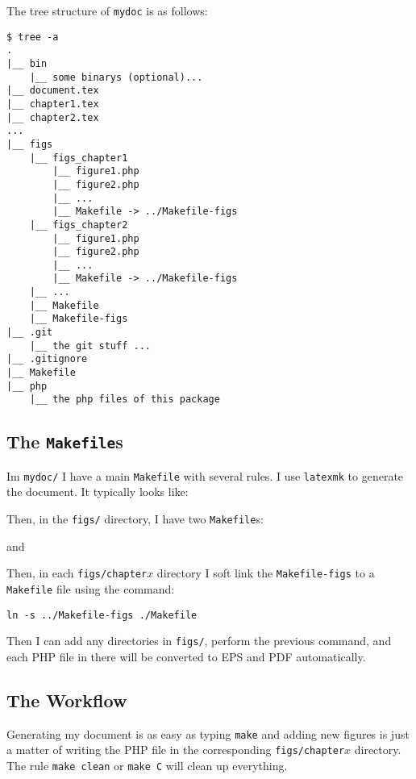 \documentclass[a4paper]{scrartcl}
\begin{document}
The tree structure of \texttt{mydoc} is as follows:
\begin{lstlisting}
$ tree -a
.
|__ bin
    |__ some binarys (optional)...
|__ document.tex
|__ chapter1.tex
|__ chapter2.tex
...
|__ figs
    |__ figs_chapter1
        |__ figure1.php
        |__ figure2.php
        |__ ...
        |__ Makefile -> ../Makefile-figs
    |__ figs_chapter2
        |__ figure1.php
        |__ figure2.php
        |__ ...
        |__ Makefile -> ../Makefile-figs
    |__ ...
    |__ Makefile
    |__ Makefile-figs
|__ .git
    |__ the git stuff ...
|__ .gitignore
|__ Makefile
|__ php
    |__ the php files of this package
\end{lstlisting}

\subsection{The \texttt{Makefile}s}
Im \texttt{mydoc/} I have a main \texttt{Makefile} with several rules. I use
\texttt{latexmk} to generate the document. It typically looks like:


Then, in the \texttt{figs/} directory, I have two \texttt{Makefile}s:

and

Then, in each \texttt{figs/chapter$x$} directory I soft link the \texttt{Makefile-figs}
to a \texttt{Makefile} file using the command:
\begin{center}
\texttt{ln -s ../Makefile-figs ./Makefile}
\end{center}
Then I can add any directories in \texttt{figs/}, perform the previous command, and each PHP
file in there will be converted to EPS and PDF automatically.

\subsection{The Workflow}
Generating my document is as easy as typing \lstinline{make} and adding new figures is just a matter
of writing the PHP file in the corresponding \texttt{figs/chapter$x$} directory.
The rule \texttt{make clean} or \texttt{make C} will clean up everything.
\end{document}
